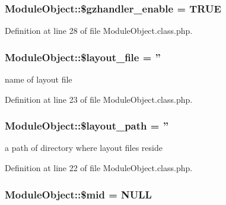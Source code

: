 \hypertarget{classModuleObject_acda88247a161a0ddf878e8f504909329}{
\subsubsection[{\$gzhandler\-\_\-enable}]{\setlength{\rightskip}{0pt plus 5cm}Module\-Object\-::\$gzhandler\-\_\-enable = T\-R\-U\-E}}\label{classModuleObject_acda88247a161a0ddf878e8f504909329}


Definition at line 28 of file Module\-Object.\-class.\-php.

\hypertarget{classModuleObject_a2a1677b06eb7b3ff04ff19e960a64e08}{
\subsubsection[{\$layout\-\_\-file}]{\setlength{\rightskip}{0pt plus 5cm}Module\-Object\-::\$layout\-\_\-file = ''}}\label{classModuleObject_a2a1677b06eb7b3ff04ff19e960a64e08}


name of layout file 



Definition at line 23 of file Module\-Object.\-class.\-php.

\hypertarget{classModuleObject_ada660958e777413d332337fba67d657f}{
\subsubsection[{\$layout\-\_\-path}]{\setlength{\rightskip}{0pt plus 5cm}Module\-Object\-::\$layout\-\_\-path = ''}}\label{classModuleObject_ada660958e777413d332337fba67d657f}


a path of directory where layout files reside 



Definition at line 22 of file Module\-Object.\-class.\-php.

\hypertarget{classModuleObject_abb68807f12d0fde6c9ea78a1a820d250}{
\subsubsection[{\$mid}]{\setlength{\rightskip}{0pt plus 5cm}Module\-Object\-::\$mid = N\-U\-L\-L}}\label{classModuleObject_abb68807f12d0fde6c9ea78a1a820d250}


